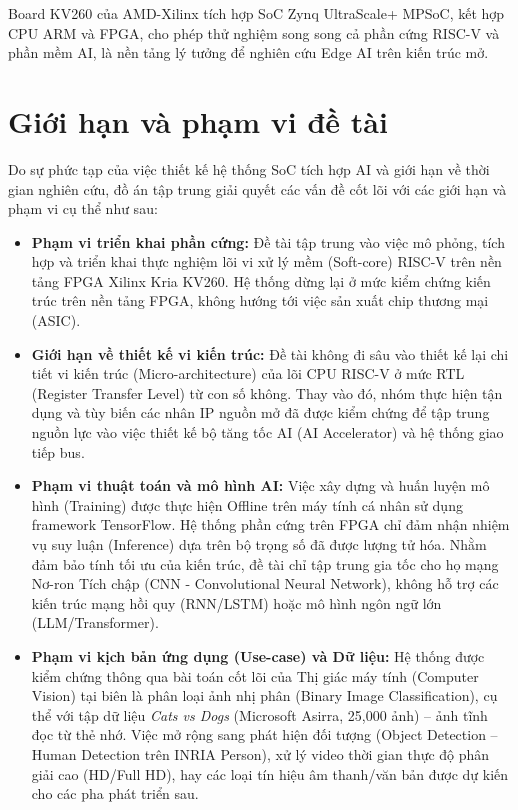 Board KV260 của AMD-Xilinx tích hợp SoC Zynq UltraScale+ MPSoC, kết hợp CPU ARM và FPGA, cho phép thử nghiệm song song cả phần cứng RISC-V và phần mềm AI, là nền tảng lý tưởng để nghiên cứu Edge AI trên kiến trúc mở.

\newpage
\section{Giới hạn và phạm vi đề tài}

Do sự phức tạp của việc thiết kế hệ thống SoC tích hợp AI và giới hạn về thời gian nghiên cứu, đồ án tập trung giải quyết các vấn đề cốt lõi với các giới hạn và phạm vi cụ thể như sau:

\begin{itemize}
    \item \textbf{Phạm vi triển khai phần cứng:} Đề tài tập trung vào việc mô phỏng, tích hợp và triển khai thực nghiệm lõi vi xử lý mềm (Soft-core) RISC-V trên nền tảng FPGA Xilinx Kria KV260. Hệ thống dừng lại ở mức kiểm chứng kiến trúc trên nền tảng FPGA, không hướng tới việc sản xuất chip thương mại (ASIC).

    \item \textbf{Giới hạn về thiết kế vi kiến trúc:} Đề tài không đi sâu vào thiết kế lại chi tiết vi kiến trúc (Micro-architecture) của lõi CPU RISC-V ở mức RTL (Register Transfer Level) từ con số không. Thay vào đó, nhóm thực hiện tận dụng và tùy biến các nhân IP nguồn mở đã được kiểm chứng để tập trung nguồn lực vào việc thiết kế bộ tăng tốc AI (AI Accelerator) và hệ thống giao tiếp bus.

    \item \textbf{Phạm vi thuật toán và mô hình AI:} Việc xây dựng và huấn luyện mô hình (Training) được thực hiện Offline trên máy tính cá nhân sử dụng framework TensorFlow. Hệ thống phần cứng trên FPGA chỉ đảm nhận nhiệm vụ suy luận (Inference) dựa trên bộ trọng số đã được lượng tử hóa. Nhằm đảm bảo tính tối ưu của kiến trúc, đề tài chỉ tập trung gia tốc cho họ mạng Nơ-ron Tích chập (CNN - Convolutional Neural Network), không hỗ trợ các kiến trúc mạng hồi quy (RNN/LSTM) hoặc mô hình ngôn ngữ lớn (LLM/Transformer).

    \item \textbf{Phạm vi kịch bản ứng dụng (Use-case) và Dữ liệu:} Hệ thống được kiểm chứng thông qua bài toán cốt lõi của Thị giác máy tính (Computer Vision) tại biên là phân loại ảnh nhị phân (Binary Image Classification), cụ thể với tập dữ liệu \textit{Cats vs Dogs} (Microsoft Asirra, 25{,}000 ảnh) -- ảnh tĩnh đọc từ thẻ nhớ. Việc mở rộng sang phát hiện đối tượng (Object Detection -- Human Detection trên INRIA Person), xử lý video thời gian thực độ phân giải cao (HD/Full HD), hay các loại tín hiệu âm thanh/văn bản được dự kiến cho các pha phát triển sau.


\end{itemize}
